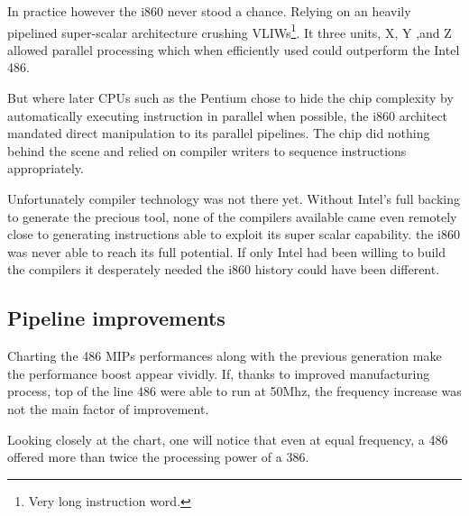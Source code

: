 \bigskip
\par
In practice however the i860 never stood a chance. Relying on an heavily pipelined super-scalar architecture crushing VLIWs\footnote{Very long instruction word.}. It three units, X, Y ,and Z allowed parallel processing which when efficiently used could outperform the Intel 486.\\
\par
But where later CPUs such as the Pentium chose to hide the chip complexity by automatically executing instruction in parallel when possible, the i860 architect mandated direct manipulation to its parallel pipelines. The chip did nothing behind the scene and relied on compiler writers to sequence instructions appropriately.\\
\par
Unfortunately compiler technology was not there yet. Without Intel's full backing to generate the precious tool, none of the compilers available came even remotely close to generating instructions able to exploit its super scalar capability. the i860 was never able to reach its full potential. If only Intel had been willing to build the compilers it desperately needed the i860 history could have been different.\\
\par
\par
{}
\par
{}

\par
\subsection{Pipeline improvements}
Charting the 486 MIPs performances along with the previous generation make the performance boost appear vividly. If, thanks to improved manufacturing process, top of the line 486 were able to run at 50Mhz, the frequency increase was not the main factor of improvement.\\
\par
 Looking closely at the chart, one will notice that even at equal frequency, a 486 offered more than twice the processing power of a 386.\\

